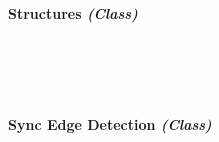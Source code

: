 \begin{FlushLeft}
\begin{enumerate}
    \begin{figure}[H]
        \centering
    \end{figure}\\

    \bk

    \paragraph*{Structures \textit{(Class)}} \mbox{} \\

    \begin{figure}[H]
        \centering
    \end{figure}\\

    \bk

    \paragraph*{Sync Edge Detection \textit{(Class)}} \mbox{} \\


\end{enumerate}
\end{FlushLeft}
